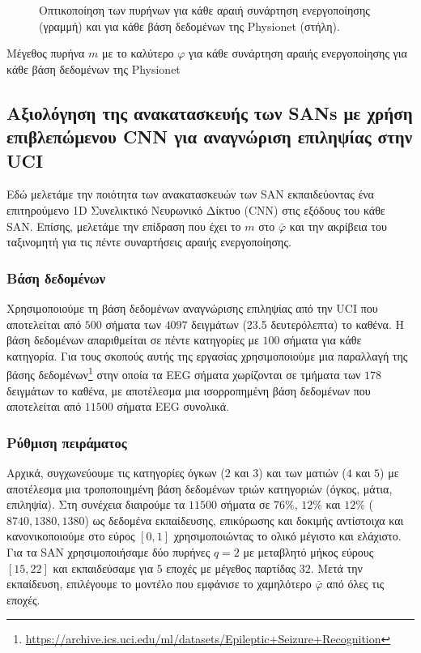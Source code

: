 \begin{figure}
	\centering
	
	\caption{Οπτικοποίηση των πυρήνων για κάθε αραιή συνάρτηση ενεργοποίησης (γραμμή) και για κάθε βάση δεδομένων της Physionet (στήλη).
	}
	\label{fig:kernelvisualization}
\end{figure}

\begin{table}
	\centering
	\caption{Μέγεθος πυρήνα $m$ με το καλύτερο $\varphi$ για κάθε συνάρτηση αραιής ενεργοποίησης για κάθε βάση δεδομένων της Physionet}
	\label{table:crrl}
	
\end{table}

\subsection{Αξιολόγηση της ανακατασκευής των SANs με χρήση επιβλεπώμενου CNN για αναγνώριση επιληψίας στην UCI}
Εδώ μελετάμε την ποιότητα των ανακατασκευών των SAN εκπαιδεύοντας ένα επιτηρούμενο 1D Συνελικτικό Νευρωνικό Δίκτυο (CNN) στις εξόδους του κάθε SAN\@.
Επίσης, μελετάμε την επίδραση που έχει το $m$ στο $\bar\varphi$ και την ακρίβεια του ταξινομητή για τις πέντε συναρτήσεις αραιής ενεργοποίησης.

\subsubsection{Βάση δεδομένων}
Χρησιμοποιούμε τη βάση δεδομένων αναγνώρισης επιληψίας από την UCI που αποτελείται από $500$ σήματα των $4097$ δειγμάτων (23.5 δευτερόλεπτα) το καθένα.
Η βάση δεδομένων απαριθμείται σε πέντε κατηγορίες με $100$ σήματα για κάθε κατηγορία.
Για τους σκοπούς αυτής της εργασίας χρησιμοποιούμε μια παραλλαγή της βάσης δεδομένων\footnote{\url{https://archive.ics.uci.edu/ml/datasets/Epileptic+Seizure+Recognition}} στην οποία τα EEG σήματα χωρίζονται σε τμήματα των $178$ δειγμάτων το καθένα, με αποτέλεσμα μια ισορροπημένη βάση δεδομένων που αποτελείται από $11500$ σήματα EEG συνολικά.

\subsubsection{Ρύθμιση πειράματος}
Αρχικά, συγχωνεύουμε τις κατηγορίες όγκων ($2$ και $3$) και των ματιών ($4$ και $5$) με αποτέλεσμα μια τροποποιημένη βάση δεδομένων τριών κατηγοριών (όγκος, μάτια, επιληψία).
Στη συνέχεια διαιρούμε τα $11500$ σήματα σε $76\%$, $12\%$ και $12\%$ ($8740,1380,1380$) ως δεδομένα εκπαίδευσης, επικύρωσης και δοκιμής αντίστοιχα και κανονικοποιούμε στο εύρος $[0, 1]$ χρησιμοποιώντας το ολικό μέγιστο και ελάχιστο.
Για τα SAN χρησιμοποιήσαμε δύο πυρήνες $q = 2$ με μεταβλητό μήκος εύρους $[15, 22]$ και εκπαιδεύσαμε για $5$ εποχές με μέγεθος παρτίδας $32$.
Μετά την εκπαίδευση, επιλέγουμε το μοντέλο που εμφάνισε το χαμηλότερο $\bar\varphi$ από όλες τις εποχές.

